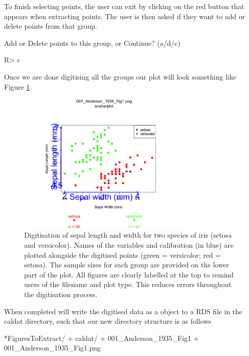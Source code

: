 \documentclass[article]{jss}
\newcommand{\fct}[1]{\code{#1()}}
\begin{document}
To finish selecting points, the user can exit by clicking on the red button that appears when extracting points. The user is then asked if they want to add or delete points from that group. 

\begin{CodeChunk}
\begin{CodeOutput}
Add or Delete points to this group, or Continue? (a/d/c) 
\end{CodeOutput}
\begin{CodeInput}
R> c
\end{CodeInput}
\end{CodeChunk}

Once we are done digitising all the groups our plot will look something like Figure \ref{fig:scatter_extract}.

\begin{figure}[!h] 
\centering
 \includegraphics[width=0.75\textwidth]{001_Anderson_1935_Fig1_digitised.png} 
 \caption{Digitisation of sepal length and width for two species of iris (setosa and versicolor). Names of the variables and calibration (in blue) are plotted alongside the digitised points (green = versicolor; red = setosa). The sample sizes for each group are provided on the lower part of the plot. All figures are clearly labelled at the top to remind users of the filename and plot type. This reduces errors throughout the digitisation process.}
\label{fig:scatter_extract}
\end{figure}

When completed \fct{metaDigitise} will write the digitised data as a  object to a RDS file in the caldat directory, such that our new directory structure is as follows

\begin{CodeChunk}
\begin{CodeOutput}
*FiguresToExtract/
    + caldat/
        + 001_Anderson_1935_Fig1
    + 001_Anderson_1935_Fig1.png
\end{CodeOutput}
\end{CodeChunk}
\end{document}
